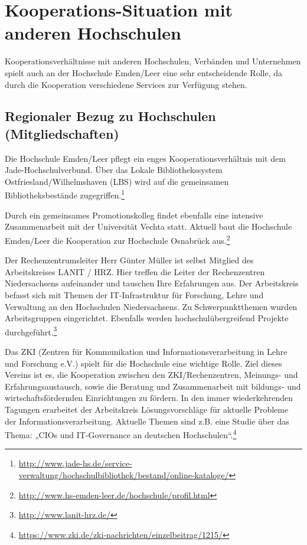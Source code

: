 \section{Kooperations-Situation mit anderen Hochschulen}
\label{section_kooperations_situation}

Kooperationsverhältnisse mit anderen Hochschulen, Verbänden und Unternehmen spielt auch an der Hochschule Emden/Leer eine sehr entscheidende Rolle, da durch die Kooperation verschiedene Services zur Verfügung stehen.

\subsection{Regionaler Bezug zu Hochschulen (Mitgliedschaften)}
Die Hochschule Emden/Leer pflegt ein enges Kooperationsverhältnis mit dem Jade-Hochschulverbund. Über das Lokale Bibliothekssystem Ostfriesland/Wilhelmshaven (LBS) wird auf die gemeinsamen  Bibliotheksbestände zugegriffen.\footnote{\url{http://www.jade-hs.de/service-verwaltung/hochschulbibliothek/bestand/online-kataloge/}}

Durch ein gemeinsames Promotionskolleg findet ebenfalls eine intensive Zusammenarbeit mit der Universität Vechta statt. Aktuell baut die Hochschule Emden/Leer die Kooperation zur Hochschule Osnabrück aus.\footnote{\url{http://www.hs-emden-leer.de/hochschule/profil.html}}

Der Rechenzentrumsleiter Herr Günter Müller ist selbst Mitglied des Arbeitskreises LANIT / HRZ. Hier treffen die Leiter der Rechenzentren Niedersachsens aufeinander und tauschen Ihre Erfahrungen aus. Der Arbeitskreis befasst sich mit Themen der IT-Infrastruktur für Forschung, Lehre und Verwaltung an den Hochschulen Niedersachsens. Zu Schwerpunktthemen wurden Arbeitsgruppen eingerichtet.  Ebenfalls werden hochschulübergreifend Projekte durchgeführt.\footnote{\url{http://www.lanit-hrz.de/}}

Das ZKI (Zentren für Kommunikation und Informationsverarbeitung in Lehre und Forschung e.V.) spielt für die Hochschule eine wichtige Rolle. Ziel dieses Vereins ist es, die Kooperation zwischen den ZKI/Rechenzentren, Meinungs- und Erfahrungsaustausch, sowie die Beratung und Zusammenarbeit mit bildungs- und wirtschaftsfördernden Einrichtungen zu fördern. In den immer wiederkehrenden Tagungen erarbeitet der Arbeitskreis Lösungsvorschläge für aktuelle Probleme der Informationsverarbeitung. Aktuelle Themen sind z.B. eine Studie über das Thema: „CIOs und IT-Governance an deutschen Hochschulen“.\footnote{\url{https://www.zki.de/zki-nachrichten/einzelbeitrag/1215/}}


